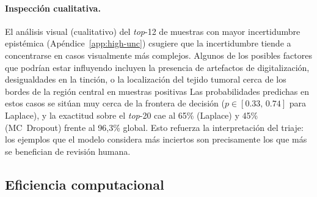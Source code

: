 \documentclass{article}
\begin{document}
\paragraph{Inspección cualitativa.}
El análisis visual (cualitativo) del \emph{top}-12 de muestras con mayor incertidumbre
epistémica (Ap\'endice~\ref{app:high-unc}) csugiere que la incertidumbre tiende a concentrarse en casos visualmente más complejos.
Algunos de los posibles factores que podrían estar influyendo incluyen la presencia de artefactos de digitalización,
desigualdades en la tinción, o la localización del tejido tumoral cerca de los bordes de la región central en muestras positivas
Las probabilidades predichas en estos casos se sitúan
muy cerca de la frontera de decisión (\(p\in[0{.}33,\,0{.}74]\) para
Laplace), y la exactitud sobre el \emph{top}-20 cae al 65\% (Laplace) y
45\% (MC~Dropout) frente al 96,3\% global. Esto refuerza la
interpretación del triaje: los ejemplos que el modelo considera
más inciertos son precisamente los que más se benefician de revisión
humana.

\subsection{Eficiencia computacional}
\label{sec:efficiency-results}

\end{document}
